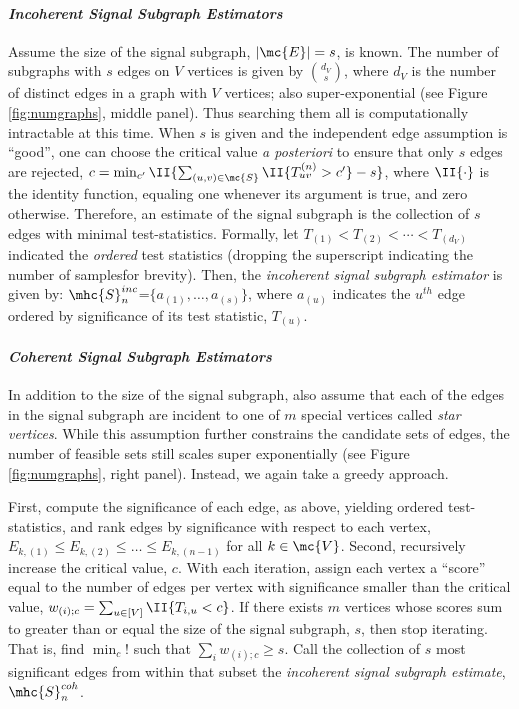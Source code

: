 \documentclass[10pt,journal,cspaper,compsoc]{IEEEtran}
\begin{document}
\paragraph{\emph{Incoherent Signal Subgraph Estimators}} %
\label{par:paragraph_name}


Assume the size of the signal subgraph, $|\mc{E}|=s$, is known.  The number of subgraphs with $s$ edges on $V$ vertices is given by $\binom{d_V}{s}$, where $d_V$ is the number of distinct edges in a graph with $V$ vertices; also super-exponential (see Figure \ref{fig:numgraphs}, middle panel). Thus searching them all is computationally intractable at this time.  When $s$ is given and the independent edge assumption is ``good'', one can choose the critical value \emph{a posteriori} to ensure that only $s$ edges are rejected, $c = \min_{c'} \II\{\sum_{(u,v) \in \mc{S}} \II \{T_{uv}^{(n)} > c'\}-s\}$,  where $\II\{\cdot\}$ is the identity function, equaling one whenever its argument is true, and zero otherwise.  Therefore, an estimate of the signal subgraph is the collection of $s$ edges with minimal test-statistics.  Formally, let $T_{(1)} < T_{(2)} < \cdots < T_{(d_V)}$ indicated the \emph{ordered} test statistics (dropping the superscript indicating the number of samplesfor brevity).  Then, the \emph{incoherent signal subgraph estimator} is given by: $\mhc{S}^{inc}_n$=$\{a_{(1)}, \ldots, a_{(s)}\}$, where $a_{(u)}$ indicates the $u^{th}$ edge ordered by significance of its test statistic, $T_{(u)}$.

\paragraph{\emph{Coherent Signal Subgraph Estimators}}

In addition to the size of the signal subgraph, also assume that each of the edges in the signal subgraph are incident to one of $m$ special vertices called \emph{star vertices}. While this assumption further constrains the candidate sets of edges, the number of feasible sets still scales super exponentially (see Figure \ref{fig:numgraphs}, right panel).  Instead, we again take a greedy approach.  

First, compute the significance of each edge, as above, yielding ordered test-statistics, and rank edges by significance with respect to each vertex,  $E_{k,(1)} \leq E_{k,(2)} \leq \ldots \leq E_{k,(n-1)}$ for all $k \in \mc{V}$.  Second, recursively increase the critical value, $c$. With each iteration, assign each vertex a ``score'' equal to the number of edges per vertex with significance smaller than the critical value, $w_{(i);c}=\sum_{u \in [V]} \II\{T_{i,u} < c\}$.  If there exists $m$ vertices whose scores sum to greater than or equal the size of the signal subgraph, $s$, then stop iterating.  That is, find $\min_c !$ such that $\sum_{i} w_{(i);c}\geq s$.  Call the collection of $s$ most significant edges from within that subset the \emph{incoherent signal subgraph estimate}, $\mhc{S}^{coh}_n$.
\end{document}
